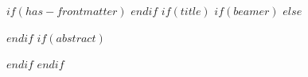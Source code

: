
$if(has-frontmatter)$
\frontmatter
$endif$
$if(title)$
$if(beamer)$
\frame{\titlepage}
$else$
\maketitle
$endif$
$if(abstract)$
\begin{abstract}
$abstract$
\end{abstract}
$endif$
$endif$
